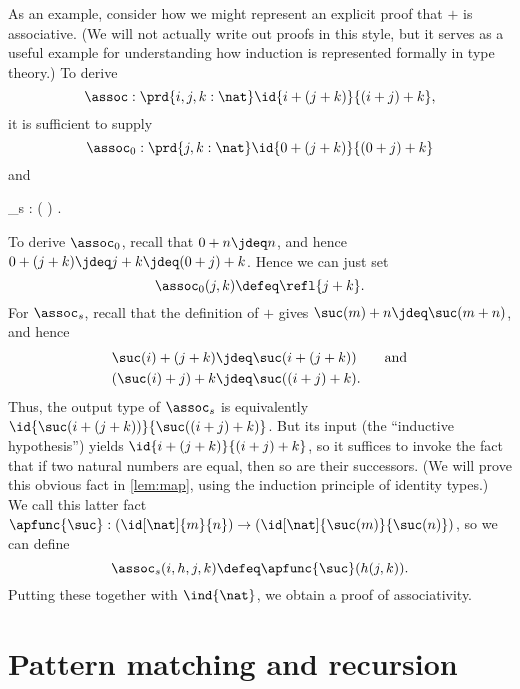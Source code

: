 As an example, consider how we might represent an explicit proof that $+$ is associative.
(We will not actually write out proofs in this style, but it serves as a useful example for understanding how induction is represented formally in type theory.)
To derive
\[\assoc : \prd{i,j,k:\nat} \id{i + (j + k)}{(i + j) + k}, \]
it is sufficient to supply
\[ \assoc_0 :  \prd{j,k:\nat} \id{0 + (j + k)}{(0+ j) + k} \]
and
\begin{narrowmultline*}
  \assoc_s  :  \left( \right)
   \narrowbreak
   \to {} .
\end{narrowmultline*}
To derive $\assoc_0$, recall that $0+n \jdeq n$, and hence  $0 + (j + k) \jdeq j+k \jdeq (0+ j) + k$.
Hence we can just set
\[ \assoc_0(j,k) \defeq \refl{j+k}. \]
For $\assoc_s$, recall that the definition of $+$ gives $\suc(m)+n \jdeq \suc(m+n)$, and hence 
\begin{align*}
   \suc(i) + (j + k)  &\jdeq \suc(i+(j+k)) \qquad\text{and}\\
   (\suc(i)+j)+k &\jdeq \suc((i+j)+k).
\end{align*}
Thus, the output type of $\assoc_s$ is equivalently $\id{\suc(i+(j+k))}{\suc((i+j)+k)}$.
But its input (the ``inductive hypothesis'')
%
%
yields $\id{i+(j+k)}{(i+j)+k}$, so it suffices to invoke the fact that if two natural numbers are equal, then so are their successors.
(We will prove this obvious fact in \cref{lem:map}, using the induction principle of identity types.)
We call this latter fact
$\apfunc{\suc} : %
(\id[\nat]{m}{n}) \to (\id[\nat]{\suc(m)}{\suc(n)})$, so we can define
\[\assoc_s(i,h,j,k) \defeq \apfunc{\suc}( %
h(j,k)). \]
Putting these together with $\ind{\nat}$, we obtain a proof of associativity.

%


\section{Pattern matching and recursion}
\label{sec:pattern-matching}

